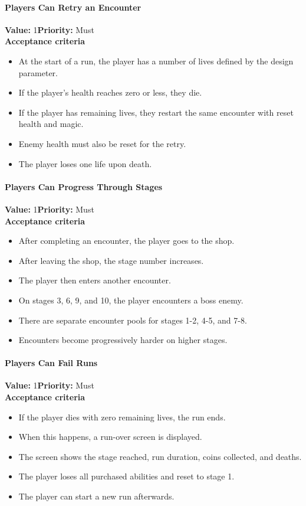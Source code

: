\paragraph{Players Can Retry an Encounter}
\textbf{Value:} 1\quad \textbf{Priority:} Must\\
\textbf{Acceptance criteria}
\begin{itemize}
  \item At the start of a run, the player has a number of lives defined by the design parameter.
  \item If the player's health reaches zero or less, they die.
  \item If the player has remaining lives, they restart the same encounter with reset health and magic.
  \item Enemy health must also be reset for the retry.
  \item The player loses one life upon death.
\end{itemize}

\paragraph{Players Can Progress Through Stages}
\textbf{Value:} 1\quad \textbf{Priority:} Must\\
\textbf{Acceptance criteria}
\begin{itemize}
  \item After completing an encounter, the player goes to the shop.
  \item After leaving the shop, the stage number increases.
  \item The player then enters another encounter.
  \item On stages 3, 6, 9, and 10, the player encounters a boss enemy.
  \item There are separate encounter pools for stages 1-2, 4-5, and 7-8.
  \item Encounters become progressively harder on higher stages.
\end{itemize}

\paragraph{Players Can Fail Runs}
\textbf{Value:} 1\quad \textbf{Priority:} Must\\
\textbf{Acceptance criteria}
\begin{itemize}
  \item If the player dies with zero remaining lives, the run ends.
  \item When this happens, a run-over screen is displayed.
  \item The screen shows the stage reached, run duration, coins collected, and deaths.
  \item The player loses all purchased abilities and reset to stage 1.
  \item The player can start a new run afterwards.
\end{itemize}

